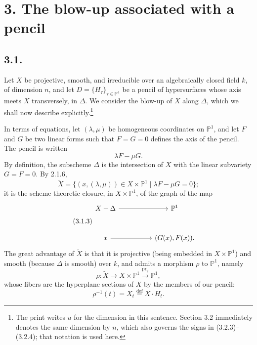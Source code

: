 \section*{3. The blow-up associated with a pencil}

\subsection*{3.1.}
Let $X$ be projective, smooth, and irreducible over an algebraically closed
field $k$, of dimension $n$, and let
$D=\{H_\tau\}_{\tau\in\mathbb P^1}$ be a pencil of hypersurfaces whose axis
meets $X$ transversely, in $\Delta$.
We consider the blow-up of $X$ along $\Delta$, which we shall now describe
explicitly.\footnote{The print writes $u$ for the dimension in this sentence.
Section 3.2 immediately denotes the same dimension by $n$, which also
governs the signs in (3.2.3)--(3.2.4); that notation is used here.}

In terms of equations, let $(\lambda,\mu)$ be homogeneous coordinates on
$\mathbb P^1$, and let $F$ and $G$ be two linear forms such that $F=G=0$
defines the axis of the pencil.  The pencil is written
\begin{equation}\tag{3.1.1}
\lambda F-\mu G.
\end{equation}
By definition, the subscheme $\Delta$ is the intersection of $X$ with the
linear subvariety $G=F=0$.  By 2.1.6,
\begin{equation}\tag{3.1.2}
\widetilde X
=\{(x,(\lambda,\mu))\in X\times\mathbb P^1
       \mid \lambda F-\mu G=0\};
\end{equation}
it is the scheme-theoretic closure, in $X\times\mathbb P^1$, of the graph of
the map
\begin{equation}\tag{3.1.3}
\begin{tikzcd}[row sep=large,column sep=huge]
X-\Delta \arrow[r] & \mathbb P^1 \\
x \arrow[r] & (G(x),F(x)).
\end{tikzcd}
\end{equation}
The great advantage of $\widetilde X$ is that it is projective (being
embedded in $X\times\mathbb P^1$) and smooth (because $\Delta$ is smooth)
over $k$, and admits a morphism $\rho$ to $\mathbb P^1$, namely
\begin{equation}\tag{3.1.4}
\rho:\widetilde X\longrightarrow X\times\mathbb P^1
\xrightarrow{\operatorname{pr}_2}\mathbb P^1,
\end{equation}
whose fibers are the hyperplane sections of $X$ by the members of our
pencil:
\[
\rho^{-1}(t)=X_t\overset{\mathrm{def}}{=}X\cdot H_t.
\]

